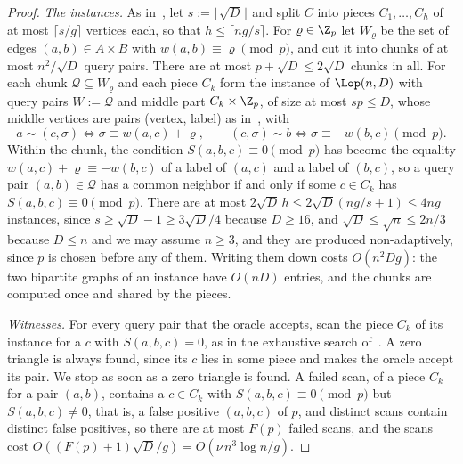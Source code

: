 \begin{proof}
\emph{The instances.} As in~\cite{CX24}, let $s:=\lfloor\sqrt D\rfloor$ and split $C$ into pieces $C_1,\ldots,C_h$ of at most $\lceil s/g\rceil$ vertices each, so that $h\le\lceil ng/s\rceil$. For $\varrho\in\Z_p$ let $W_\varrho$ be the set of edges $(a,b)\in A\times B$ with $w(a,b)\equiv\varrho\pmod p$, and cut it into chunks of at most $n^2/\sqrt D$ query pairs. There are at most $p+\sqrt D\le2\sqrt D$ chunks in all. For each chunk $\mathcal Q\subseteq W_\varrho$ and each piece $C_k$ form the instance of $\Lop(n,D)$ with query pairs $W:=\mathcal Q$ and middle part $C_k\times\Z_p$, of size at most $sp\le D$, whose middle vertices are pairs (vertex, label) as in~\cite{CX24}, with
\[
a\sim(c,\sigma)\iff\sigma\equiv w(a,c)+\varrho,\qquad(c,\sigma)\sim b\iff\sigma\equiv-w(b,c)\pmod p .
\]
Within the chunk, the condition $S(a,b,c)\equiv0\pmod p$ has become the equality $w(a,c)+\varrho\equiv-w(b,c)$ of a label of $(a,c)$ and a label of $(b,c)$, so a query pair $(a,b)\in\mathcal Q$ has a common neighbor if and only if some $c\in C_k$ has $S(a,b,c)\equiv0\pmod p$. There are at most $2\sqrt D\,h\le2\sqrt D(ng/s+1)\le4ng$ instances, since $s\ge\sqrt D-1\ge3\sqrt D/4$ because $D\ge16$, and $\sqrt D\le\sqrt n\le2n/3$ because $D\le n$ and we may assume $n\ge3$, and they are produced non-adaptively, since $p$ is chosen before any of them. Writing them down costs $O(n^2Dg)$: the two bipartite graphs of an instance have $O(nD)$ entries, and the chunks are computed once and shared by the pieces.

\emph{Witnesses.} For every query pair that the oracle accepts, scan the piece $C_k$ of its instance for a $c$ with $S(a,b,c)=0$, as in the exhaustive search of~\cite{CX24}. A zero triangle is always found, since its $c$ lies in some piece and makes the oracle accept its pair. We stop as soon as a zero triangle is found. A failed scan, of a piece $C_k$ for a pair $(a,b)$, contains a $c\in C_k$ with $S(a,b,c)\equiv0\pmod p$ but $S(a,b,c)\ne0$, that is, a false positive $(a,b,c)$ of $p$, and distinct scans contain distinct false positives, so there are at most $F(p)$ failed scans, and the scans cost $O((F(p)+1)\sqrt D/g)=O(\nu\,n^3\log n/g)$.
\end{proof}

